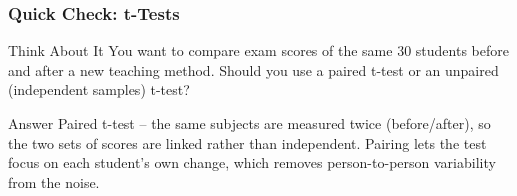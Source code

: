 \begin{frame}[fragile]\frametitle{Quick Check: t-Tests}
\begin{block}{Think About It}
You want to compare exam scores of the same 30 students before and after a new teaching method. Should you use a paired t-test or an unpaired (independent samples) t-test?
\end{block}
\pause
\begin{block}{Answer}
Paired t-test -- the same subjects are measured twice (before/after), so the two sets of scores are linked rather than independent. Pairing lets the test focus on each student's own change, which removes person-to-person variability from the noise.
\end{block}
\end{frame}
